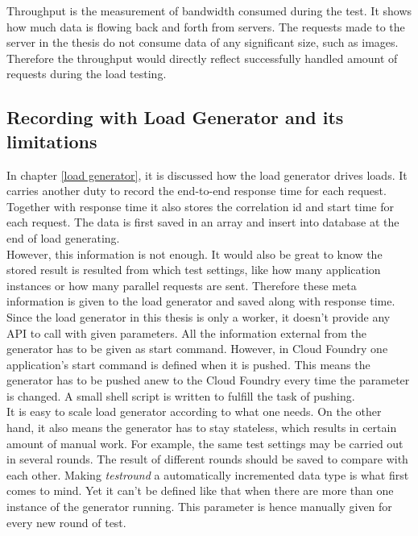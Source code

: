 Throughput is the measurement of bandwidth consumed during the test. It shows how much data is flowing back and forth from servers. The requests made to the server in the thesis do not consume data of any significant size, such as images. Therefore the throughput would directly reflect successfully handled amount of requests during the load testing. \\
\subsection{Recording with Load Generator and its limitations}
 In chapter \ref{load generator}, it is discussed how the load generator drives loads. It carries another duty to record the end-to-end response time for each request. Together with response time it also stores the correlation id and start time for each request. The data is first saved in an array and insert into database at the end of load generating. \\
 However, this information is not enough. It would also be great to know the stored result is resulted from which test settings, like how many application instances or how many parallel requests are sent. Therefore these meta information is given to the load generator and saved along with response time. Since the load generator in this thesis is only a worker, it doesn't provide any API to call with given parameters. All the information external from the generator has to be given as start command. However, in Cloud Foundry one application's start command is defined when it is pushed. This means the generator has to be pushed anew to the Cloud Foundry every time the parameter is changed. A small shell script is written to fulfill the task of pushing. \\
 
 It is easy to scale load generator according to what one needs. On the other hand, it also means the generator has to stay stateless, which results in certain amount of manual work. For example, the same test settings may be carried out in several rounds. The result of different rounds should be saved to compare with each other. Making \textit{testround }a automatically incremented data type is what first comes to mind. Yet it can't be defined like that when there are more than one instance of the generator running. This parameter is hence manually given for every new round of test.\\
 
